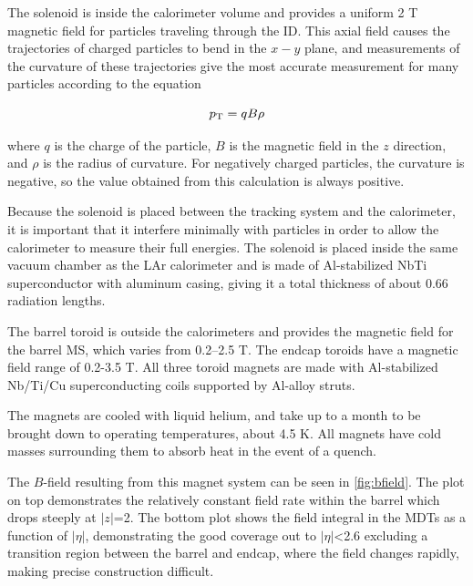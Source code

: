 The solenoid is inside the calorimeter volume and provides a uniform 2 T magnetic field for particles traveling through the \ac{ID}. This axial field causes the trajectories of charged particles to bend in the $x-y$ plane, and measurements of the curvature of these trajectories give the most accurate \pt measurement for many particles according to the equation

\begin{equation}
p_{\text{T}} = qB\rho 
\end{equation}

where $q$ is the charge of the particle, $B$ is the magnetic field in the $z$ direction, and $\rho$ is the radius of curvature. For negatively charged particles, the curvature is negative, so the \pt value obtained from this calculation is always positive.

Because the solenoid is placed between the tracking system and the calorimeter, it is important that it interfere minimally with particles in order to allow the calorimeter to measure their full energies. The solenoid is placed inside the same vacuum chamber as the LAr calorimeter and is made of Al-stabilized NbTi superconductor with aluminum casing, giving it a total thickness of about 0.66 radiation lengths. 

The barrel toroid is outside the calorimeters and provides the magnetic field for the barrel \ac{MS}, which varies from 0.2–2.5 T. The endcap toroids have a magnetic field range of 0.2-3.5 T. All three toroid magnets are made with Al-stabilized Nb/Ti/Cu superconducting coils supported by Al-alloy struts. 

The magnets are cooled with liquid helium, and take up to a month to be brought down to operating temperatures, about 4.5 K. All magnets have cold masses surrounding them to absorb heat in the event of a quench. 

The $B$-field resulting from this magnet system can be seen in \autoref{fig:bfield}. The plot on top demonstrates the relatively constant field rate within the barrel which drops steeply at $|z|$=2. The bottom plot shows the field integral in the \acp{MDT} as a function of $|\eta|$, demonstrating the good coverage out to $|\eta|$<2.6 excluding a transition region between the barrel and endcap, where the field changes rapidly, making precise \pt construction difficult. 

